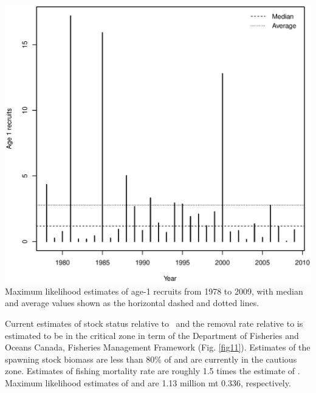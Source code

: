 \begin{multicols}{2}
\begin{figurehere}
	\centering
	\includegraphics[width=0.9\columnwidth]{iscamFigs/phakefig14.eps}\\
	\caption{Maximum likelihood estimates of age-1 recruits from 1978 to 2009, with median and average values shown as the horizontal dashed and dotted lines.}\label{fig10}
\end{figurehere}

Current estimates of stock status relative to \bmsy\ and the removal rate relative to \fmsy is estimated to be in the critical zone in term of the Department of Fisheries and Oceans Canada, Fisheries Management Framework (Fig. \ref{fig11}).  Estimates of the spawning stock biomass are less than 80\% of \bmsy and are currently in the cautious zone.  Estimates of fishing mortality rate are roughly 1.5 times the estimate of \fmsy.  Maximum likelihood estimates of \bmsy and \fmsy are 1.13 million mt 0.336, respectively. 


\end{multicols}

